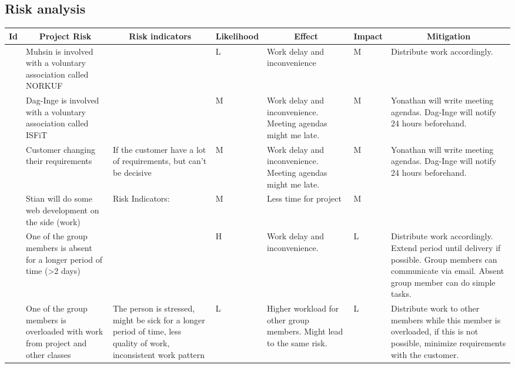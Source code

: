\begin{landscape}

\section{Risk analysis}
	
\centering
\begin{longtable}{| p{0.4cm} | p{4cm} | p{4cm} | p{2cm} | p{4cm} | p{1cm} | p{4cm} |}
	\hline
		\multicolumn{1}{|c|}{ Id}   & 
		\multicolumn{1}{c|}{ Project Risk}  & 
		\multicolumn{1}{c|}{ Risk indicators}  & 
		\multicolumn{1}{c|}{ Likelihood} & 
		\multicolumn{1}{c|}{ Effect} & 
		\multicolumn{1}{c|}{ Impact} & 
		\multicolumn{1}{c|}{ Mitigation} \\
		\hline \hline
	\endhead

	\centering
	1 & 
	Muhsin is involved with a voluntary association called NORKUF & 
	& 
	\centering L & 
	Work delay and inconvenience & 
	\centering M & 
	Distribute work accordingly. \\
	\hline

	\centering
		2 & 
		Dag-Inge is involved with a voluntary association called ISFiT & 
		& \centering M & 
		Work delay and inconvenience. Meeting agendas might me late. & 
		\centering  M & 
		Yonathan will write meeting agendas. Dag-Inge will notify 24 hours beforehand. \\
	\hline
	\centering
		3 & 
		Customer changing their requirements & 
		If the customer have a lot of requirements, but can’t be decisive & 
		\centering M & 
		Work delay and inconvenience. Meeting agendas might me late. & 
		\centering  M & 
		Yonathan will write meeting agendas. Dag-Inge will notify 24 hours beforehand. \\
	\hline

	\centering
		4 &
		Stian will do some web development on the side (work) &
		Risk Indicators: &
		\centering M &
		Less time for project &
		\centering M & \\
	\hline

	\centering
		5 &
		One of the group members is absent for a longer period of time (>2 days) &
		& \centering H &
		Work delay and inconvenience. &
		\centering  L &
		Distribute work accordingly. Extend period until delivery if possible. Group members can communicate via email. Absent group member can do simple tasks. \\
	\hline

	\centering
		6 &
		One of the group members is overloaded with work from project and other classes &
		The person is stressed, might be sick for a longer period of time, less quality of work, inconsistent work pattern &
		\centering L &
		Higher workload for other group members. Might lead to the same risk. &
		\centering  L & Distribute work to other members while this member is overloaded, if this is not possible, minimize requirements with the customer. \\
	\hline


\end{longtable}
\end{landscape}
